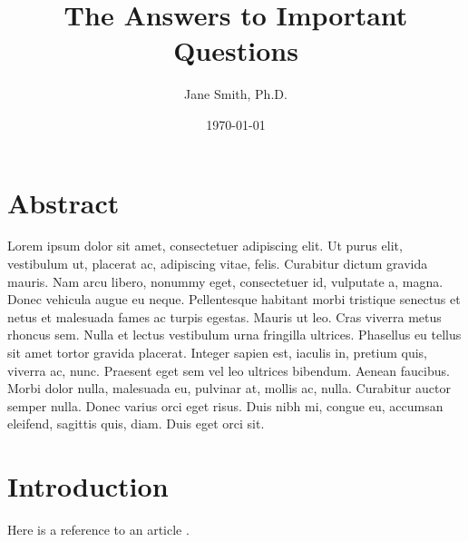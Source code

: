 \documentclass[11pt]{article}
\title{The Answers to Important Questions}
\author{Jane Smith, Ph.D.}
\date{\today}
\begin{document}
\maketitle

\section*{Abstract}

Lorem ipsum dolor sit amet, consectetuer adipiscing elit. Ut purus
elit, vestibulum ut, placerat ac, adipiscing vitae,
felis. Curabitur dictum gravida mauris. Nam arcu libero, nonummy
eget, consectetuer id, vulputate a, magna. Donec vehicula augue eu
neque. Pellentesque habitant morbi tristique senectus et netus et
malesuada fames ac turpis egestas. Mauris ut leo. Cras viverra
metus rhoncus sem. Nulla et lectus vestibulum urna fringilla
ultrices. Phasellus eu tellus sit amet tortor gravida
placerat. Integer sapien est, iaculis in, pretium quis, viverra
ac, nunc. Praesent eget sem vel leo ultrices bibendum. Aenean
faucibus. Morbi dolor nulla, malesuada eu, pulvinar at, mollis ac,
nulla. Curabitur auctor semper nulla. Donec varius orci eget
risus. Duis nibh mi, congue eu, accumsan eleifend, sagittis quis,
diam. Duis eget orci sit.

\section*{Introduction}

\lipsum[1]

Here is a reference to an article \citep{mattar:2005aa}.

\lipsum[2-3]



\end{document}
